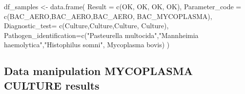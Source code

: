 \documentclass[
]{article}
\newenvironment{Shaded}{\begin{snugshade}}{\end{snugshade}}
\newcommand{\AttributeTok}[1]{\textcolor[rgb]{0.77,0.63,0.00}{#1}}
\newcommand{\FunctionTok}[1]{\textcolor[rgb]{0.00,0.00,0.00}{#1}}
\newcommand{\NormalTok}[1]{#1}
\newcommand{\OtherTok}[1]{\textcolor[rgb]{0.56,0.35,0.01}{#1}}
\newcommand{\StringTok}[1]{\textcolor[rgb]{0.31,0.60,0.02}{#1}}
\begin{document}
\begin{Shaded}
\begin{Highlighting}[]
\NormalTok{df\_samples }\OtherTok{\textless{}{-}} \FunctionTok{data.frame}\NormalTok{(}
  \AttributeTok{Result =} \FunctionTok{c}\NormalTok{(}\StringTok{\textquotesingle{}OK\textquotesingle{}}\NormalTok{, }\StringTok{\textquotesingle{}OK\textquotesingle{}}\NormalTok{, }\StringTok{\textquotesingle{}OK\textquotesingle{}}\NormalTok{, }\StringTok{\textquotesingle{}OK\textquotesingle{}}\NormalTok{),}
  \AttributeTok{Parameter\_code =} \FunctionTok{c}\NormalTok{(}\StringTok{\textquotesingle{}BAC\_AERO\textquotesingle{}}\NormalTok{,}\StringTok{\textquotesingle{}BAC\_AERO\textquotesingle{}}\NormalTok{,}\StringTok{\textquotesingle{}BAC\_AERO\textquotesingle{}}\NormalTok{, }\StringTok{\textquotesingle{}BAC\_MYCOPLASMA\textquotesingle{}}\NormalTok{),}
  \AttributeTok{Diagnostic\_test=} \FunctionTok{c}\NormalTok{(}\StringTok{\textquotesingle{}Culture\textquotesingle{}}\NormalTok{,}\StringTok{\textquotesingle{}Culture\textquotesingle{}}\NormalTok{,}\StringTok{\textquotesingle{}Culture\textquotesingle{}}\NormalTok{, }\StringTok{\textquotesingle{}Culture\textquotesingle{}}\NormalTok{),}
  \AttributeTok{Pathogen\_identification=}\FunctionTok{c}\NormalTok{(}\StringTok{"Pasteurella multocida"}\NormalTok{,}\StringTok{"Mannheimia haemolytica"}\NormalTok{,}\StringTok{"Histophilus somni"}\NormalTok{, }\StringTok{\textquotesingle{}Mycoplasma bovis\textquotesingle{}}\NormalTok{)}
\NormalTok{)}
\end{Highlighting}
\end{Shaded}

\hypertarget{data-manipulation-mycoplasma-culture-results}{%
\subsection{Data manipulation MYCOPLASMA CULTURE
results}\label{data-manipulation-mycoplasma-culture-results}}
\end{document}
